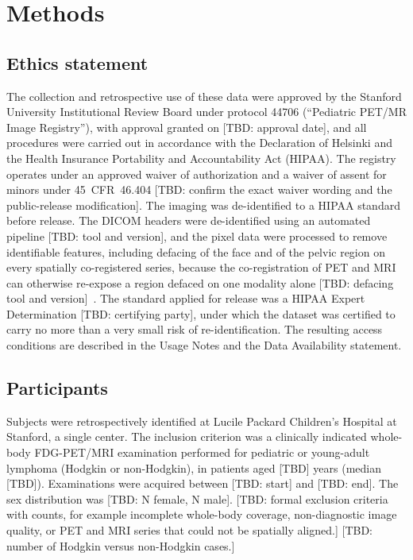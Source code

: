 
\section*{Methods}\label{sec:methods}

\subsection*{Ethics statement}\label{subsec:ethics}
The collection and retrospective use of these data were approved by the Stanford University Institutional Review Board under protocol 44706 (``Pediatric PET/MR Image Registry''), with approval granted on [TBD: approval date], and all procedures were carried out in accordance with the Declaration of Helsinki and the Health Insurance Portability and Accountability Act (HIPAA).
The registry operates under an approved waiver of authorization and a waiver of assent for minors under 45~CFR~46.404 [TBD: confirm the exact waiver wording and the public-release modification].
The imaging was de-identified to a HIPAA standard before release.
The DICOM headers were de-identified using an automated pipeline [TBD: tool and version], and the pixel data were processed to remove identifiable features, including defacing of the face and of the pelvic region on every spatially co-registered series, because the co-registration of PET and MRI can otherwise re-expose a region defaced on one modality alone [TBD: defacing tool and version]~\cite{Selfridge_2023}.
The standard applied for release was a HIPAA Expert Determination [TBD: certifying party], under which the dataset was certified to carry no more than a very small risk of re-identification.
The resulting access conditions are described in the Usage Notes and the Data Availability statement.

\subsection*{Participants}\label{subsec:cohort}
Subjects were retrospectively identified at Lucile Packard Children's Hospital at Stanford, a single center.
The inclusion criterion was a clinically indicated whole-body FDG-PET/MRI examination performed for pediatric or young-adult lymphoma (Hodgkin or non-Hodgkin), in patients aged [TBD] years (median [TBD]).
Examinations were acquired between [TBD: start] and [TBD: end].
The sex distribution was [TBD: N female, N male].
[TBD: formal exclusion criteria with counts, for example incomplete whole-body coverage, non-diagnostic image quality, or PET and MRI series that could not be spatially aligned.]
[TBD: number of Hodgkin versus non-Hodgkin cases.]

